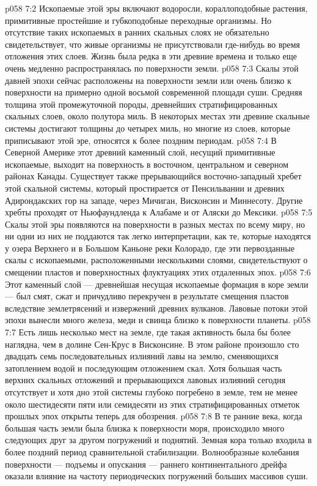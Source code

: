 \vs p058 7:2 Ископаемые этой эры включают водоросли, кораллоподобные растения, примитивные простейшие и губкоподобные переходные организмы. Но отсутствие таких ископаемых в ранних скальных слоях не обязательно свидетельствует, что живые организмы не присутствовали где\hyp{}нибудь во время отложения этих слоев. Жизнь была редка в эти древние времена и только еще очень медленно распространялась по поверхности земли.
\vs p058 7:3 \pc Скалы этой давней эпохи сейчас расположены на поверхности земли или очень близко к поверхности на примерно одной восьмой современной площади суши. Средняя толщина этой промежуточной породы, древнейших стратифицированных скальных слоев, около полутора миль. В некоторых местах эти древние скальные системы достигают толщины до четырех миль, но многие из слоев, которые приписывают этой эре, относятся к более поздним периодам.
\vs p058 7:4 В Северной Америке этот древний каменный слой, несущий примитивные ископаемые, выходит на поверхность в восточном, центральном и северном районах Канады. Существует также прерывающийся восточно\hyp{}западный хребет этой скальной системы, который простирается от Пенсильвании и древних Адирондакских гор на западе, через Мичиган, Висконсин и Миннесоту. Другие хребты проходят от Ньюфаундленда к Алабаме и от Аляски до Мексики.
\vs p058 7:5 Скалы этой эры появляются на поверхности в разных местах по всему миру, но ни одни из них не поддаются так легко интерпретации, как те, которые находятся у озера Верхнего и в Большом Каньоне реки Колорадо, где эти первозданные скалы с ископаемыми, расположенными несколькими слоями, свидетельствуют о смещении пластов и поверхностных флуктуациях этих отдаленных эпох.
\vs p058 7:6 Этот каменный слой --- древнейшая несущая ископаемые формация в коре земли --- был смят, сжат и причудливо перекручен в результате смещения пластов вследствие землетрясений и извержений древних вулканов. Лавовые потоки этой эпохи вынесли много железа, меди и свинца близко к поверхности планеты.
\vs p058 7:7 Есть лишь несколько мест на земле, где такая активность была бы более наглядна, чем в долине Сен\hyp{}Крус в Висконсине. В этом районе произошло сто двадцать семь последовательных излияний лавы на землю, сменяющихся затоплением водой и последующим отложением скал. Хотя большая часть верхних скальных отложений и прерывающихся лавовых излияний сегодня отсутствует и хотя дно этой системы глубоко погребено в земле, тем не менее около шестидесяти пяти или семидесяти из этих стратифицированных отметок прошлых эпох открыты теперь для обозрения.
\vs p058 7:8 \pc В те ранние века, когда большая часть земли была близка к поверхности моря, происходило много следующих друг за другом погружений и поднятий. Земная кора только входила в более поздний период сравнительной стабилизации. Волнообразные колебания поверхности --- подъемы и опускания --- раннего континентального дрейфа оказали влияние на частоту периодических погружений больших массивов суши.
